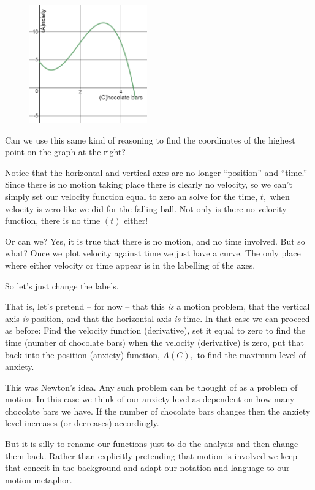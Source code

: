 \begin{figure}
\captionsetup{labelformat=empty}
\centerline{\includegraphics*[height=2in,width=2in]{Figures/metaphor1}}
\label{fig:metaphor1}
\end{figure}
Can we use this same kind of reasoning to find the coordinates of the
highest point on the graph at the right?

Notice that the horizontal and vertical axes are no longer
``position'' and ``time.'' Since there is no motion taking place there
is clearly no velocity, so we can't simply set our velocity function
equal to zero an solve for the time, $t,$ when velocity is zero like
we did for the falling ball. Not only is there no velocity function,
there is no time $(t)$ either!

Or can we? Yes, it is true that there is no motion, and no time
involved. But so what? Once we plot velocity against time we just have
a curve. The only place where either velocity or time appear is in the
labelling of the axes. 

So let's just change the labels.

That is, let's pretend -- for now -- that this \emph{is} a motion
problem, that the vertical axis \emph{is} position, and that the
horizontal axis \emph{is} time. In that case we can proceed as before:
Find the velocity function (derivative), set it equal to zero to find
the time (number of chocolate bars) when the velocity (derivative) is
zero, put that back into the position (anxiety) function, $A(C),$ to
find the maximum level of anxiety.

This was Newton's idea.  Any such problem can be thought of as a
problem of motion. In this case we think of our anxiety level as
dependent on how many chocolate bars we have. If the number of
chocolate bars changes then the anxiety level increases (or decreases)
accordingly.

But it is silly to rename our functions just to do the analysis and
then change them back. Rather than explicitly pretending that motion
is involved we keep that conceit in the background and adapt our
notation and language to our motion metaphor.

